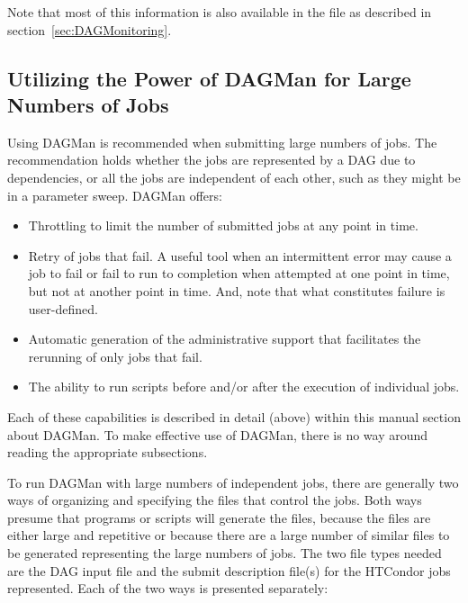 Note that most of this information is also available in the
 file as described in section~\ref{sec:DAGMonitoring}.

\subsection{\label{sec:DAGLotsaJobs}Utilizing the Power of DAGMan for Large Numbers of Jobs}

Using DAGMan is recommended when submitting large numbers of jobs.
The recommendation holds whether the jobs are represented by
a DAG due to dependencies, or all the jobs are
independent of each other, such as they might be in a parameter sweep.
DAGMan offers:
\begin{itemize}
\item{Throttling}
  to limit the number of submitted jobs at any point in time.
\item{Retry of jobs that fail.}
  A useful tool when an intermittent error may cause a job to fail
  or fail to run to completion when attempted at one point in time,
  but not at another point in time.
  And, note that what constitutes failure is user-defined.
\item{Automatic generation of the administrative support that facilitates the
  rerunning of only jobs that fail.}
\item{The ability to run scripts before and/or after the execution of
individual jobs.}
\end{itemize}

Each of these capabilities is described in detail (above)
within this manual section about DAGMan.
To make effective use of DAGMan, there is no way around reading the 
appropriate subsections.

To run DAGMan with large numbers of independent jobs,
there are generally two ways of organizing and specifying the
files that control the jobs.
Both ways presume that programs or scripts will generate the files,
because the files are either large and repetitive
or because there are a large number of similar files to be
generated representing the large numbers of jobs.
The two file types needed are the DAG input file and the
submit description file(s) for the HTCondor jobs represented.
Each of the two ways is presented separately:

